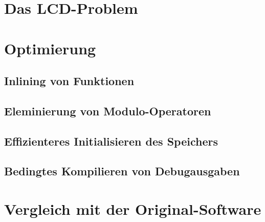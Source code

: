 \section{Das LCD-Problem}
\section{Optimierung}
\subsection{Inlining von Funktionen}
\subsection{Eleminierung von Modulo-Operatoren}
\subsection{Effizienteres Initialisieren des Speichers}
\subsection{Bedingtes Kompilieren von Debugausgaben}
\section{Vergleich mit der Original-Software}
